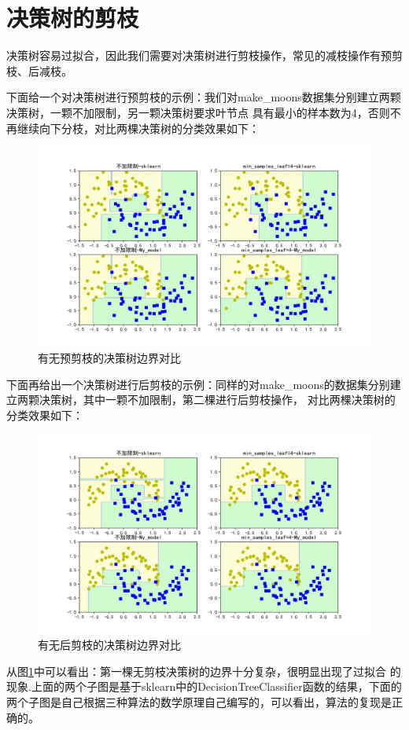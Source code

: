 \documentclass{SHUarticle}
\begin{document}
\section{决策树的剪枝}
决策树容易过拟合，因此我们需要对决策树进行剪枝操作，常见的减枝操作有预剪枝、后减枝。
\par 下面给一个对决策树进行预剪枝的示例：我们对make\_moons数据集分别建立两颗决策树，一颗不加限制，另一颗决策树要求叶节点
具有最小的样本数为4，否则不再继续向下分枝，对比两棵决策树的分类效果如下：
\begin{figure}[!h]
  \centering
  \includegraphics[scale = 0.6]{../Images/决策树预减枝.jpg}
  \caption{有无预剪枝的决策树边界对比}
  \label{fig:ex1}
\end{figure}
下面再给出一个决策树进行后剪枝的示例：同样的对make\_moons的数据集分别建立两颗决策树，其中一颗不加限制，第二棵进行后剪枝操作，
对比两棵决策树的分类效果如下：
\begin{figure}[!h]
	\centering
	\includegraphics[scale=0.6]{../Images/决策树后剪枝.jpg}
	\caption{有无后剪枝的决策树边界对比}
	\label{fig2:ex2}
\end{figure}
从图\ref{fig:ex1}中可以看出：第一棵无剪枝决策树的边界十分复杂，很明显出现了过拟合
的现象.上面的两个子图是基于sklearn中的DecisionTreeClassifier函数的结果，下面的
两个子图是自己根据三种算法的数学原理自己编写的，可以看出，算法的复现是正确的。
\end{document}
